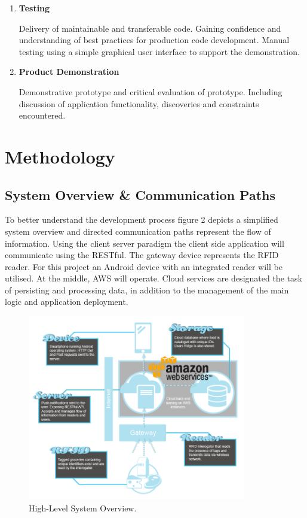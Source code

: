 \documentclass[a4paper, 11pt]{article}
\begin{document}
\begin{enumerate}
  \item \textbf{Testing}
   	\begin{flushleft}Delivery of maintainable and transferable code. Gaining confidence and understanding of best practices for production code development. Manual testing using a simple graphical user interface to support the demonstration.
 	\end{flushleft}
 
 \item \textbf{Product Demonstration}
 	\begin{flushleft}Demonstrative prototype and critical evaluation of prototype. Including discussion of application functionality, discoveries and constraints encountered.
 	\end{flushleft}
\end{enumerate}
\clearpage







\section{Methodology}

\subsection{System Overview \& Communication Paths}

To better understand the development process figure 2 depicts a simplified system overview and directed communication paths represent the flow of information. Using the client server paradigm the client side application will communicate using the RESTful. The gateway device represents the RFID reader. For this project an Android device with an integrated reader will be utilised. At the middle, AWS will operate. Cloud services are designated the task of persisting and processing data, in addition to the management of the main logic and application deployment. 

\begin{figure}[h!]
  \centering
    \includegraphics[width=0.85\textwidth]{system6.png}
      \caption{High-Level System Overview.}
\end{figure}
\end{document}
